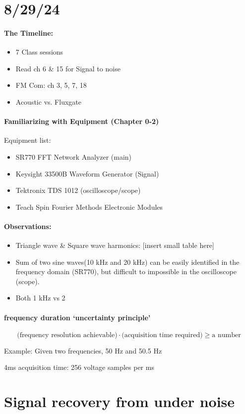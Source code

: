 \documentclass[../main.tex]{subfiles}
\begin{document}
\pagestyle{fancy}

\section*{8/29/24}

\paragraph*{The Timeline:}
\begin{itemize}
    \item 7 Class sessions
    \item Read ch 6 \& 15 for Signal to noise
    \item FM Com: ch 3, 5, 7, 18
    \item Acoustic vs. Fluxgate
\end{itemize}
\paragraph*{Familiarizing with Equipment (Chapter 0-2)}

Equipment list:
\begin{itemize}
    \item SR770 FFT Network Analyzer (main)
    \item Keysight 33500B Waveform Generator (Signal)
    \item Tektronix TDS 1012 (oscilloscope/scope)
    \item Teach Spin Fourier Methods Electronic Modules
\end{itemize}

\paragraph*{Observations:}
\begin{itemize}
    \item Triangle wave \& Square wave harmonics: [insert small table here]
    \item Sum of two sine waves(10 kHz and 20 kHz) can be easily identified in the frequency domain (SR770), but difficult to impossible in the oscilloscope (scope).
    \item Both 1 kHz vs 2
\end{itemize}

\paragraph*{frequency duration `uncertainty principle'}

\[\textrm{(frequency resolution achievable)} \cdot \textrm{(acquisition time required)} \geq  \textrm{a number}\]

Example: Given two frequencies, 50 Hz and 50.5 Hz

4ms acquisition time: 256 voltage samples per ms

\newpage
\section*{Signal recovery from under noise}
\end{document}

